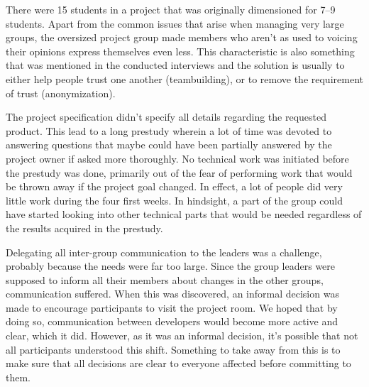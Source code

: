 There were 15 students in a project that was originally dimensioned for 7--9 students. Apart from the common issues that arise when managing very large groups, the oversized project group made members who aren't as used to voicing their opinions express themselves even less. This characteristic is also something that was mentioned in the conducted interviews and the solution is usually to either help people trust one another (teambuilding), or to remove the requirement of trust (anonymization). 

The project specification didn't specify all details regarding the requested product. This lead to a long prestudy wherein a lot of time was devoted to answering questions that maybe could have been partially answered by the project owner if asked more thoroughly. No technical work was initiated before the prestudy was done, primarily out of the fear of performing work that would be thrown away if the project goal changed. In effect, a lot of people did very little work during the four first weeks. In hindsight, a part of the group could have started looking into other technical parts that would be needed regardless of the results acquired in the prestudy.

Delegating all inter-group communication to the leaders was a challenge, probably because the needs were far too large. Since the group leaders were supposed to inform all their members about changes in the other groups, communication suffered. When this was discovered, an informal decision was made to encourage participants to visit the project room. We hoped that by doing so, communication between developers would become more active and clear, which it did. However, as it was an informal decision, it's possible that not all participants understood this shift. Something to take away from this is to make sure that all decisions are clear to everyone affected before committing to them. %


